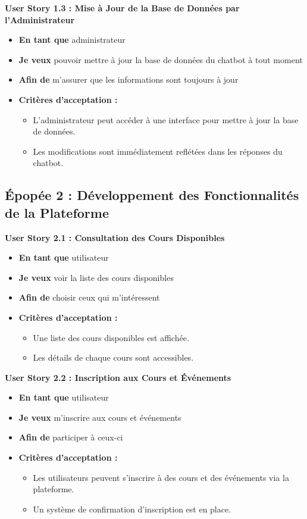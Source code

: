\documentclass[a4paper, 11pt, openany]{report}
\begin{document}
\textbf{User Story 1.3 : Mise à Jour de la Base de Données par l'Administrateur}
\begin{itemize}
    \item \textbf{En tant que} administrateur
    \item \textbf{Je veux} pouvoir mettre à jour la base de données du chatbot à tout moment
    \item \textbf{Afin de} m'assurer que les informations sont toujours à jour
    \item \textbf{Critères d'acceptation :}
    \begin{itemize}
        \item L'administrateur peut accéder à une interface pour mettre à jour la base de données.
        \item Les modifications sont immédiatement reflétées dans les réponses du chatbot.
    \end{itemize}
\end{itemize}

\subsection{Épopée 2 : Développement des Fonctionnalités de la Plateforme}

\textbf{User Story 2.1 : Consultation des Cours Disponibles}
\begin{itemize}
    \item \textbf{En tant que} utilisateur
    \item \textbf{Je veux} voir la liste des cours disponibles
    \item \textbf{Afin de} choisir ceux qui m'intéressent
    \item \textbf{Critères d'acceptation :}
    \begin{itemize}
        \item Une liste des cours disponibles est affichée.
        \item Les détails de chaque cours sont accessibles.
    \end{itemize}
\end{itemize}

\textbf{User Story 2.2 : Inscription aux Cours et Événements}
\begin{itemize}
    \item \textbf{En tant que} utilisateur
    \item \textbf{Je veux} m'inscrire aux cours et événements
    \item \textbf{Afin de} participer à ceux-ci
    \item \textbf{Critères d'acceptation :}
    \begin{itemize}
        \item Les utilisateurs peuvent s'inscrire à des cours et des événements via la plateforme.
        \item Un système de confirmation d'inscription est en place.
    \end{itemize}
\end{itemize}
\end{document}

